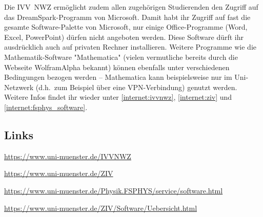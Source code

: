 \begin{multicols}{2}
Die IVV~NWZ ermöglicht zudem allen zugehörigen Studierenden den Zugriff auf das DreamSpark-Programm von Microsoft. Damit habt ihr Zugriff auf fast die gesamte Software-Palette von Microsoft, nur einige Office-Programme (Word, Excel, PowerPoint) dürfen nicht angeboten werden. Diese Software dürft ihr ausdrücklich auch auf privaten Rechner installieren. Weitere Programme wie die Mathematik-Software "Mathematica" (vielen vermutliche bereits durch die Webseite WolframAlpha bekannt) können ebenfalls unter verschiedenen Bedingungen bezogen werden -- Mathematica kann beispielsweise nur im Uni-Netzwerk (d.h.\ zum Beispiel über eine VPN-Verbindung) genutzt werden. Weitere Infos findet ihr wieder unter \cref{internet:ivvnwz}, \cref{internet:ziv} und \cref{internet:fsphys_software}.

\subsection*{Links}
\begin{flushleft}
\begin{fibelurl}
\url{https://www.uni-muenster.de/IVVNWZ}
\label{internet:ivvnwz}
\end{fibelurl}
\begin{fibelurl}
\url{https://www.uni-muenster.de/ZIV}
\label{internet:ziv}
\end{fibelurl}
\begin{fibelurl}
\url{https://www.uni-muenster.de/Physik.FSPHYS/service/software.html}
\label{internet:fsphys_software}
\end{fibelurl}
\begin{fibelurl}
\url{https://www.uni-muenster.de/ZIV/Software/Uebersicht.html}
\label{internet:ziv_software}
\end{fibelurl}
\end{flushleft}

\end{multicols}

